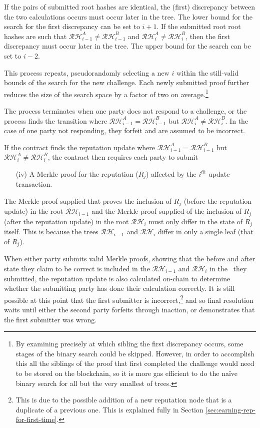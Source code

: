 If the pairs of submitted root hashes are identical, the (first) discrepancy between the two calculations occurs must occur later in the tree. The lower bound for the search for the first discrepancy can be set to $i+1$. If the submitted root root hashes are such that $\mathcal{RH}^A_{i-1}\neq\mathcal{RH}^B_{i-1}$ and $\mathcal{RH}^A_{i}\neq\mathcal{RH}^B_{i}$, then the first discrepancy must occur later in the tree. The upper bound for the search can be set to $i-2$.

This process repeats, pseudorandomly selecting a new $i$ within the still-valid bounds of the search for the new challenge. Each newly submitted proof further reduces the size of the search space by a factor of two on average.\footnote{By examining precisely at which sibling the first discrepancy occurs, some stages of the binary search could be skipped. However, in order to accomplish this all the siblings of the proof that first completed the challenge would need to be stored on the blockchain, so it is more gas efficient to do the na\"{i}ve binary search for all but the very smallest of trees.}

The process terminates when one party does not respond to a challenge, or the process finds the transition where $\mathcal{RH}^A_{i-1}=\mathcal{RH}^B_{i-1}$ but $\mathcal{RH}^A_{i}\neq\mathcal{RH}^B_{i}$. In the case of one party not responding, they forfeit and are assumed to be incorrect.

If the contract finds the reputation update where $\mathcal{RH}^A_{i-1}=\mathcal{RH}^B_{i-1}$ but $\mathcal{RH}^A_{i}\neq\mathcal{RH}^B_{i}$, the contract then requires each party to submit
\begin{itemize}
 \item[(iv)] A Merkle proof for the reputation ($R_j$) affected by the $i^{th}$ update transaction.
\end{itemize}
The Merkle proof supplied that proves the inclusion of $R_j$ (before the reputation update) in the root $\mathcal{RH}_{i-1}$ and the Merkle proof supplied of the inclusion of $R_j$ (after the reputation update) in the root $\mathcal{RH}_i$ must only differ in the state of $R_j$ itself. This is because the trees $\mathcal{RH}_{i-1}$ and $\mathcal{RH}_i$ differ in only a single leaf (that of $R_j$). 

When either party submits valid Merkle proofs, showing that the before and after state they claim to be correct is included in the $\mathcal{RH}_{i-1}$ and $\mathcal{RH}_{i}$ in the \jrh\ they submitted, the reputation update is also calculated on-chain to determine whether the submitting party has done their calculation correctly. It is still possible at this point that the first submitter is incorrect,\footnote{This is due to the possible addition of a new reputation node that is a duplicate of a previous one. This is explained fully in Section \ref{sec:earning-rep-for-first-time}.}  and so final resolution waits until either the second party forfeits through inaction, or demonstrates that the first submitter was wrong.

